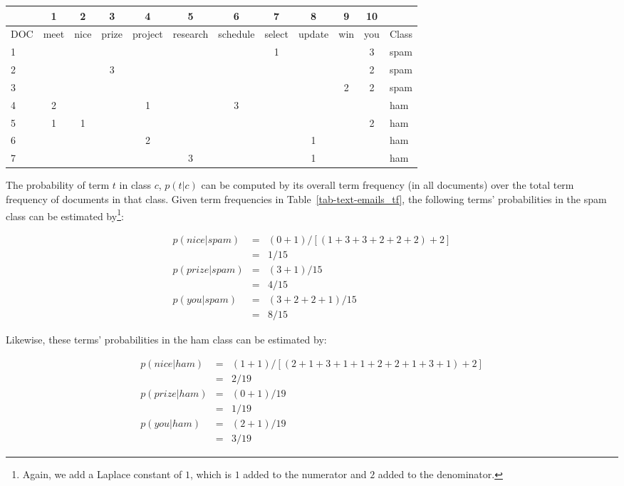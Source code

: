\documentclass[
  letterpaper,
]{scrbook}
\newcounter{none} %
\begin{document}
{\def\LTcaptype{none} %
\begin{longtable}[]{@{}lccccccccccl@{}}
\toprule\noalign{}
& 1 & 2 & 3 & 4 & 5 & 6 & 7 & 8 & 9 & 10 & \\
\midrule\noalign{}
\endhead
\bottomrule\noalign{}
\endlastfoot
DOC & meet & nice & prize & project & research & schedule & select &
update & win & you & Class \\
1 & & & & & & & 1 & & & 3 & spam \\
2 & & & 3 & & & & & & & 2 & spam \\
3 & & & & & & & & & 2 & 2 & spam \\
4 & 2 & & & 1 & & 3 & & & & & ham \\
5 & 1 & 1 & & & & & & & & 2 & ham \\
6 & & & & 2 & & & & 1 & & & ham \\
7 & & & & & 3 & & & 1 & & & ham \\
\end{longtable}
}

\protect{}\label{tab-text-emails_tf}{}

The probability of term \(t\) in class \(c\), \(p(t|c)\) can be computed
by its overall term frequency (in all documents) over the total term
frequency of documents in that class. Given term frequencies in
Table~\hyperref[tab-text-emails_tf]{{[}tab-text-emails\_tf{]}}, the
following terms' probabilities in the spam class can be estimated
by\footnote{Again, we add a Laplace constant of \(1\), which is \(1\)
  added to the numerator and \(2\) added to the denominator.}:

\[\begin{aligned}
  p(nice|spam)  & = & (0+1)/[(1+3+3+2+2+2)+2] \\
                & = & 1/15 \\
  p(prize|spam) & = & (3+1)/15 \\
                & = & 4/15 \\
  p(you|spam)   & = & (3+2+2+1)/15 \\
                & = & 8/15
\end{aligned}\]

Likewise, these terms' probabilities in the ham class can be estimated
by:

\[\begin{aligned}
  p(nice|ham)  & = & (1+1)/[(2+1+3+1+1+2+2+1+3+1)+2] \\
                & = & 2/19 \\
  p(prize|ham) & = & (0+1)/19 \\
                & = & 1/19 \\
  p(you|ham)   & = & (2+1)/19 \\
                & = & 3/19
\end{aligned}\]
\end{document}
